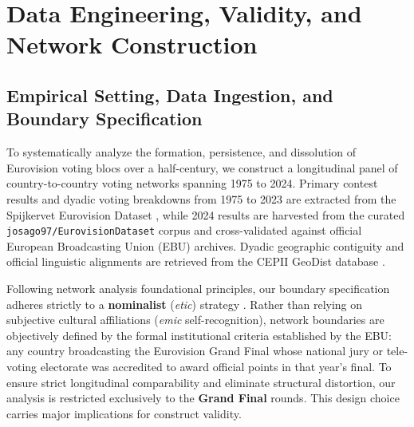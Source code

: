 \section{Data Engineering, Validity, and Network Construction}
\label{sec:data_methodology}

\subsection{Empirical Setting, Data Ingestion, and Boundary Specification}
To systematically analyze the formation, persistence, and dissolution of Eurovision voting blocs over a half-century, we construct a longitudinal panel of country-to-country voting networks spanning 1975 to 2024. Primary contest results and dyadic voting breakdowns from 1975 to 2023 are extracted from the Spijkervet Eurovision Dataset \citep{spijkervet2023}, while 2024 results are harvested from the curated \texttt{josago97/EurovisionDataset} corpus \citep{josago2025} and cross-validated against official European Broadcasting Union (EBU) archives. Dyadic geographic contiguity and official linguistic alignments are retrieved from the CEPII GeoDist database \citep{mayer2011}.

Following network analysis foundational principles, our boundary specification adheres strictly to a \textbf{nominalist} (\textit{etic}) strategy \citep{laumann1983boundary}. Rather than relying on subjective cultural affiliations (\textit{emic} self-recognition), network boundaries are objectively defined by the formal institutional criteria established by the EBU: any country broadcasting the Eurovision Grand Final whose national jury or tele-voting electorate was accredited to award official points in that year's final. To ensure strict longitudinal comparability and eliminate structural distortion, our analysis is restricted exclusively to the \textbf{Grand Final} rounds. This design choice carries major implications for construct validity.

